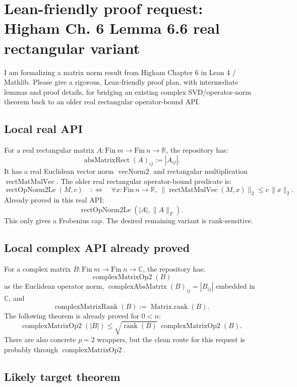 \documentclass{article}
\begin{document}
\section*{Lean-friendly proof request: Higham Ch. 6 Lemma 6.6 real rectangular variant}

I am formalizing a matrix norm result from Higham Chapter 6 in Lean 4 / Mathlib.  Please give a rigorous, Lean-friendly proof plan, with intermediate lemmas and proof details, for bridging an existing complex SVD/operator-norm theorem back to an older real rectangular operator-bound API.

\subsection*{Local real API}

For a real rectangular matrix \(A : \mathrm{Fin}\ m \to \mathrm{Fin}\ n \to \mathbb{R}\), the repository has:
\[
  \operatorname{absMatrixRect}(A)_{ij} := |A_{ij}|.
\]
It has a real Euclidean vector norm \(\operatorname{vecNorm2}\) and rectangular multiplication \(\operatorname{rectMatMulVec}\).  The older real rectangular operator-bound predicate is:
\[
  \operatorname{rectOpNorm2Le}(M,c)
  \quad:\!\!\iff\quad
  \forall x : \mathrm{Fin}\ n \to \mathbb{R},\
  \|\operatorname{rectMatMulVec}(M,x)\|_2 \le c\,\|x\|_2.
\]
Already proved in this real API:
\[
  \operatorname{rectOpNorm2Le}(|A|,\|A\|_F).
\]
This only gives a Frobenius cap.  The desired remaining variant is rank-sensitive.

\subsection*{Local complex API already proved}

For a complex matrix \(B : \mathrm{Fin}\ m \to \mathrm{Fin}\ n \to \mathbb{C}\), the repository has:
\[
  \operatorname{complexMatrixOp2}(B)
\]
as the Euclidean operator norm, \(\operatorname{complexAbsMatrix}(B)_{ij} = |B_{ij}|\) embedded in \(\mathbb{C}\), and
\[
  \operatorname{complexMatrixRank}(B) := \operatorname{Matrix.rank}(B).
\]
The following theorem is already proved for \(0<n\):
\[
  \operatorname{complexMatrixOp2}(|B|)
  \le
  \sqrt{\operatorname{rank}(B)}\,\operatorname{complexMatrixOp2}(B).
\]
There are also concrete \(p=2\) wrappers, but the clean route for this request is probably through \(\operatorname{complexMatrixOp2}\).

\subsection*{Likely target theorem}
\end{document}
